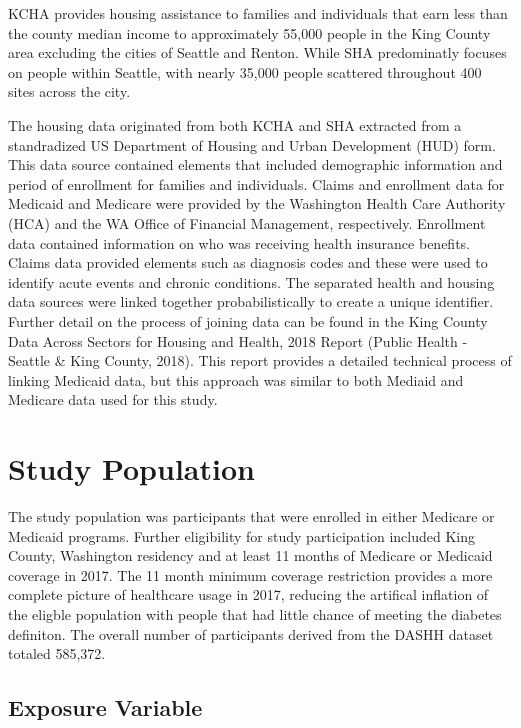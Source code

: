 \documentclass [11pt, proquest] {uwthesis}[2015/03/03]
\begin{document}
KCHA provides housing assistance to families and individuals that earn
less than the county median income to approximately 55,000 people in the
King County area excluding the cities of Seattle and Renton. While SHA
predominatly focuses on people within Seattle, with nearly 35,000 people
scattered throughout 400 sites across the city.

The housing data originated from both KCHA and SHA extracted from a
standradized US Department of Housing and Urban Development (HUD) form.
This data source contained elements that included demographic
information and period of enrollment for families and individuals.
Claims and enrollment data for Medicaid and Medicare were provided by
the Washington Health Care Authority (HCA) and the WA Office of
Financial Management, respectively. Enrollment data contained
information on who was receiving health insurance benefits. Claims data
provided elements such as diagnosis codes and these were used to
identify acute events and chronic conditions. The separated health and
housing data sources were linked together probabilistically to create a
unique identifier. Further detail on the process of joining data can be
found in the King County Data Across Sectors for Housing and Health,
2018 Report (Public Health - Seattle \& King County, 2018). This report
provides a detailed technical process of linking Medicaid data, but this
approach was similar to both Mediaid and Medicare data used for this
study.

\section{Study Population}\label{study-population}

The study population was participants that were enrolled in either
Medicare or Medicaid programs. Further eligibility for study
participation included King County, Washington residency and at least 11
months of Medicare or Medicaid coverage in 2017. The 11 month minimum
coverage restriction provides a more complete picture of healthcare
usage in 2017, reducing the artifical inflation of the eligble
population with people that had little chance of meeting the diabetes
definiton. The overall number of participants derived from the DASHH
dataset totaled 585,372.

\subsection{Exposure Variable}\label{exposure-variable}
\end{document}
